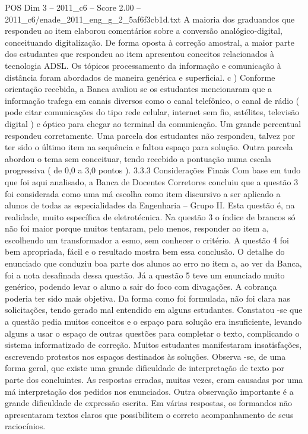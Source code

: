 \begin{textsample}{POS Dim 3 – 2011\_c6 – Score 2.00 – 2011\_c6/enade\_2011\_eng\_g\_2\_5af6f3cb1d.txt}
A maioria dos graduandos que respondeu ao item elaborou comentários sobre a conversão analógico-digital, conceituando digitalização.
De forma oposta à correção amostral, a maior parte dos estudantes que respondeu ao item apresentou conceitos relacionados à tecnologia ADSL.
Os tópicos processamento da informação e comunicação à distância foram abordados de maneira genérica e superficial. c ) Conforme orientação recebida, a Banca avaliou se os estudantes mencionaram que a informação trafega em canais diversos como o canal telefônico, o canal de rádio ( pode citar comunicações do tipo rede celular, internet sem fio, satélites, televisão digital ) e óptico para chegar ao terminal da comunicação.
Um grande percentual respondeu corretamente.
Uma parcela dos estudantes não respondeu, talvez por ter sido o último item na sequência e faltou espaço para solução.
Outra parcela abordou o tema sem conceituar, tendo recebido a pontuação numa escala progressiva ( de 0,0 a 3,0 pontos ). 3.3.3 Considerações Finais Com base em tudo que foi aqui analisado, a Banca de Docentes Corretores concluiu que a questão 3 foi considerada como uma má escolha como item discursivo a ser aplicado a alunos de todas as especialidades da Engenharia – Grupo II.
Esta questão é, na realidade, muito específica de eletrotécnica.
Na questão 3 o índice de brancos só não foi maior porque muitos tentaram, pelo menos, responder ao item a, escolhendo um transformador a esmo, sem conhecer o critério.
A questão 4 foi bem apropriada, fácil e o resultado mostra bem essa conclusão.
O detalhe do enunciado que conduziu boa parte dos alunos ao erro no item a, ao ver da Banca, foi a nota desafinada dessa questão.
Já a questão 5 teve um enunciado muito genérico, podendo levar o aluno a sair do foco com divagações.
A cobrança poderia ter sido mais objetiva.
Da forma como foi formulada, não foi clara nas solicitações, tendo gerado mal entendido em alguns estudantes.
Constatou -se que a questão pedia muitos conceitos e o espaço para solução era insuficiente, levando alguns a usar o espaço de outras questões para completar o texto, complicando o sistema informatizado de correção.
Muitos estudantes manifestaram insatisfações, escrevendo protestos nos espaços destinados às soluções.
Observa -se, de uma forma geral, que existe uma grande dificuldade de interpretação de texto por parte dos concluintes.
As respostas erradas, muitas vezes, eram causadas por uma má interpretação dos pedidos nos enunciados.
Outra observação importante é a grande dificuldade de expressão escrita.
Em várias respostas, os formandos não apresentaram textos claros que possibilitem o correto acompanhamento de seus raciocínios.

\end{textsample}
